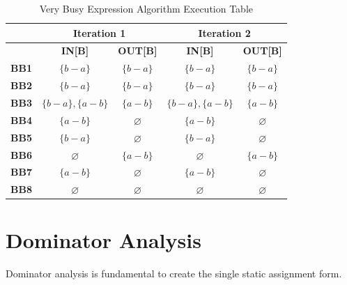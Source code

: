 \documentclass{article}
\begin{document}
\begin{table}[H]
	\centering
	\begin{tabular}{|c|c|c|c|c|}
		\hline
		             & \multicolumn{2}{c|}{\textbf{Iteration 1}} & \multicolumn{2}{c|}{\textbf{Iteration 2}}                                        \\ \hline
		             & \textbf{IN[B]}                            & \textbf{OUT[B]}                           & \textbf{IN[B]}     & \textbf{OUT[B]} \\ \hline
		\textbf{BB1} & $\{b-a\}$                                 & $\{b-a\}$                                 & $\{b-a\}$          & $\{b-a\}$       \\ \hline
		\textbf{BB2} & $\{b-a\}$                                 & $\{b-a\}$                                 & $\{b-a\}$          & $\{b-a\}$       \\ \hline
		\textbf{BB3} & $\{b-a\}, \{a-b\}$                        & $\{a-b\}$                                 & $\{b-a\}, \{a-b\}$ & $\{a-b\}$       \\ \hline
		\textbf{BB4} & $\{a-b\}$                                 & $\varnothing$                             & $\{a-b\}$          & $\varnothing$   \\ \hline
		\textbf{BB5} & $\{b - a\}$                               & $\varnothing$                             & $\{b - a\}$        & $\varnothing$   \\ \hline
		\textbf{BB6} & $\varnothing$                             & $\{a-b\}$                                 & $\varnothing$      & $\{a-b\}$       \\ \hline
		\textbf{BB7} & $\{a-b\}$                                 & $\varnothing$                             & $\{a-b\}$          & $\varnothing$   \\ \hline
		\textbf{BB8} & $\varnothing$                             & $\varnothing$                             & $\varnothing$      & $\varnothing$   \\ \hline
	\end{tabular}
	\caption{Very Busy Expression Algorithm Execution Table}
\end{table}

\section{Dominator Analysis}

Dominator analysis is fundamental to create the single static assignment form.
\end{document}
